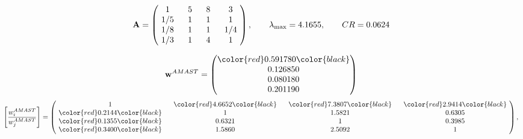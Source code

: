 \begin{example}
\begin{equation*}
\mathbf{A} =
\begin{pmatrix}
$\,\,$ 1 $\,\,$ & $\,\,$5$\,\,$ & $\,\,$8$\,\,$ & $\,\,$3 $\,\,$ \\
$\,\,$ 1/5$\,\,$ & $\,\,$ 1 $\,\,$ & $\,\,$1$\,\,$ & $\,\,$1 $\,\,$ \\
$\,\,$ 1/8$\,\,$ & $\,\,$ 1 $\,\,$ & $\,\,$ 1 $\,\,$ & $\,\,$ 1/4 $\,\,$ \\
$\,\,$ 1/3$\,\,$ & $\,\,$ 1 $\,\,$ & $\,\,$4$\,\,$ & $\,\,$ 1  $\,\,$ \\
\end{pmatrix},
\qquad
\lambda_{\max} =
4.1655,
\qquad
CR = 0.0624
\end{equation*}

\begin{equation*}
\mathbf{w}^{AMAST} =
\begin{pmatrix}
\color{red} 0.591780\color{black} \\
0.126850\\
0.080180\\
0.201190
\end{pmatrix}\end{equation*}
\begin{equation*}
\left[ \frac{{w}^{AMAST}_i}{{w}^{AMAST}_j} \right] =
\begin{pmatrix}
$\,\,$ 1 $\,\,$ & $\,\,$\color{red} 4.6652\color{black} $\,\,$ & $\,\,$\color{red} 7.3807\color{black} $\,\,$ & $\,\,$\color{red} 2.9414\color{black} $\,\,$ \\
$\,\,$\color{red} 0.2144\color{black} $\,\,$ & $\,\,$ 1 $\,\,$ & $\,\,$1.5821$\,\,$ & $\,\,$0.6305  $\,\,$ \\
$\,\,$\color{red} 0.1355\color{black} $\,\,$ & $\,\,$0.6321$\,\,$ & $\,\,$ 1 $\,\,$ & $\,\,$0.3985 $\,\,$ \\
$\,\,$\color{red} 0.3400\color{black} $\,\,$ & $\,\,$1.5860$\,\,$ & $\,\,$2.5092$\,\,$ & $\,\,$ 1  $\,\,$ \\
\end{pmatrix},
\end{equation*}


\end{example}
